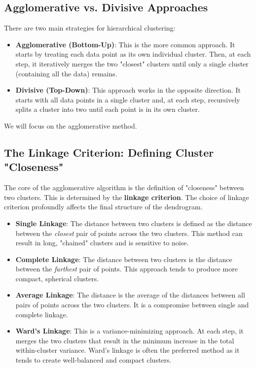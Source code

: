 \subsection*{Agglomerative vs. Divisive Approaches}
There are two main strategies for hierarchical clustering:
\begin{itemize}
    \item \textbf{Agglomerative (Bottom-Up)}: This is the more common approach. It starts by treating each data point as its own individual cluster. Then, at each step, it iteratively merges the two "closest" clusters until only a single cluster (containing all the data) remains.
    \item \textbf{Divisive (Top-Down)}: This approach works in the opposite direction. It starts with all data points in a single cluster and, at each step, recursively splits a cluster into two until each point is in its own cluster.
\end{itemize}
We will focus on the agglomerative method.

\subsection*{The Linkage Criterion: Defining Cluster "Closeness"}
The core of the agglomerative algorithm is the definition of "closeness" between two clusters. This is determined by the \textbf{linkage criterion}. The choice of linkage criterion profoundly affects the final structure of the dendrogram.
\begin{itemize}
    \item \textbf{Single Linkage}: The distance between two clusters is defined as the distance between the \textit{closest} pair of points across the two clusters. This method can result in long, "chained" clusters and is sensitive to noise.
    \item \textbf{Complete Linkage}: The distance between two clusters is the distance between the \textit{farthest} pair of points. This approach tends to produce more compact, spherical clusters.
    \item \textbf{Average Linkage}: The distance is the average of the distances between all pairs of points across the two clusters. It is a compromise between single and complete linkage.
    \item \textbf{Ward's Linkage}: This is a variance-minimizing approach. At each step, it merges the two clusters that result in the minimum increase in the total within-cluster variance. Ward's linkage is often the preferred method as it tends to create well-balanced and compact clusters.
\end{itemize}

